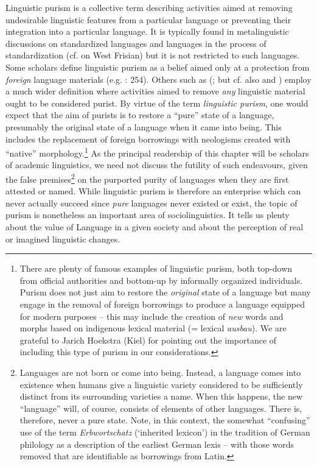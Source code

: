 \documentclass[output=paper]{langsci/langscibook}
\begin{document}
Linguistic purism is a collective term describing activities aimed at removing undesirable linguistic features from a particular language or preventing their integration into a particular language. It is typically found in metalinguistic discussions on standardized languages and languages in the process of standardization (cf. \citealt{Feitsma2002} on West Frisian) but it is not restricted to such languages. Some scholars define linguistic purism as a belief aimed only at a protection from \textit{foreign} language materials (e.g. \citealt{Trask1999}: 254). Others such as \citeauthor{Thomas1991} (\citeyear{Thomas1991}; but cf. also \citealt{LangerDavies2005} and \citealt{LangerNesse2012}) employ a much wider definition where activities aimed to remove \textit{any} linguistic material ought to be considered purist. By virtue of the term \textit{linguistic purism}, one would expect that the aim of purists is to restore a “pure” state of a language, presumably the original state of a language when it came into being. This includes the replacement of foreign borrowings with neologisms created with “native” morphology.\footnote{There are plenty of famous examples of linguistic purism, both top-down from official authorities and bottom-up by informally organized individuals. Purism does not just aim to restore the \textit{original} state of a language but many engage in the removal of foreign borrowings to produce a language equipped for modern purposes – this may include the creation of \textit{new} words and morphs based on indigenous lexical material (= lexical \textit{ausbau}). We are grateful to Jarich Hoekstra (Kiel) for pointing out the importance of including this type of purism in our considerations.} As the principal readership of this chapter will be scholars of academic linguistics, we need not discuss the futility of such endeavours, given the false premises\footnote{Languages are not born or come into being. Instead, a language comes into existence when humans give a linguistic variety considered to be sufficiently distinct from its surrounding varieties a name. When this happens, the new “language” will, of course, consists of elements of other languages. There is, therefore, never a pure state. Note, in this context, the somewhat “confusing” use of the term \textit{Erbwortschatz} (‘inherited lexicon’) in the tradition of German philology as a description of the earliest German lexis – with those words removed that are identifiable as borrowings from Latin.} on the purported purity of languages when they are first attested or named. While linguistic purism is therefore an enterprise which can never actually succeed since \textit{pure} languages never existed or exist, the topic of purism is nonetheless an important area of sociolinguistics. It tells us plenty about the value of Language in a given society and about the perception of real or imagined linguistic changes.
\end{document}
